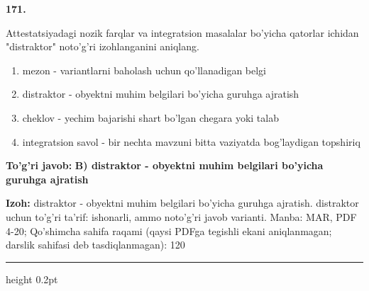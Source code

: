 \documentclass[10pt,a4paper]{article}
\begin{document}
{\bfseries\sffamily\color{ink} 171.}
\par
Attestatsiyadagi nozik farqlar va integratsion masalalar bo'yicha qatorlar ichidan "distraktor" noto'g'ri izohlanganini aniqlang.
\begin{enumerate}[label=\Alph*),leftmargin=9mm]
\item mezon - variantlarni baholash uchun qo'llanadigan belgi
\item distraktor - obyektni muhim belgilari bo'yicha guruhga ajratish
\item cheklov - yechim bajarishi shart bo'lgan chegara yoki talab
\item integratsion savol - bir nechta mavzuni bitta vaziyatda bog'laydigan topshiriq
\end{enumerate}
\begin{tcolorbox}[enhanced,breakable,colback=teal!4,colframe=teal!60!black,boxrule=0.45pt,arc=1.2mm,left=2.7mm,right=2.7mm,top=1.8mm,bottom=1.8mm,before skip=2mm,after skip=2mm]
{\bfseries\sffamily\color{teal}To'g'ri javob:} \textbf{B) distraktor - obyektni muhim belgilari bo'yicha guruhga ajratish}
\par\smallskip
{\bfseries Izoh:} distraktor - obyektni muhim belgilari bo'yicha guruhga ajratish. distraktor uchun to'g'ri ta'rif: ishonarli, ammo noto'g'ri javob varianti. Manba: MAR, PDF 4-20; Qo'shimcha sahifa raqami (qaysi PDFga tegishli ekani aniqlanmagan; darslik sahifasi deb tasdiqlanmagan): 120
\end{tcolorbox}
\vspace{2mm}\hrule height 0.2pt\vspace{3mm}
\end{document}
